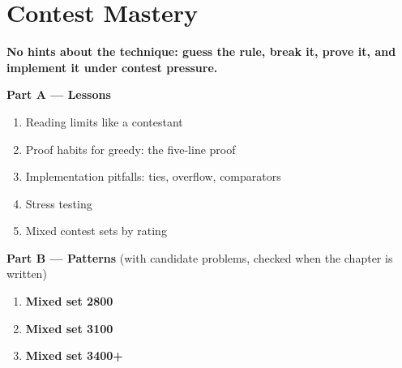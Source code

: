 \chapter{Contest Mastery}
\label{ch:mastery}

\begin{tcolorbox}[enhanced, colback=white, colframe=secondaryblue, boxrule=1pt, arc=2mm]
\textbf{\large\textcolor{primaryblue}{No hints about the technique: guess the rule, break it, prove it, and implement it under contest pressure.}}
\end{tcolorbox}


\begin{plannedbox}
\textbf{Part A --- Lessons}
\begin{enumerate}[leftmargin=*, label=\textbf{A\arabic*.}, itemsep=1pt]
    \item Reading limits like a contestant
    \item Proof habits for greedy: the five-line proof
    \item Implementation pitfalls: ties, overflow, comparators
    \item Stress testing
    \item Mixed contest sets by rating
\end{enumerate}
\textbf{Part B --- Patterns} (with candidate problems, checked when the chapter is written)
\begin{enumerate}[leftmargin=*, label=\textbf{P\arabic*.}, itemsep=1pt]
    \item \textbf{Mixed set 2800}
    \item \textbf{Mixed set 3100}
    \item \textbf{Mixed set 3400+}
\end{enumerate}
\end{plannedbox}
